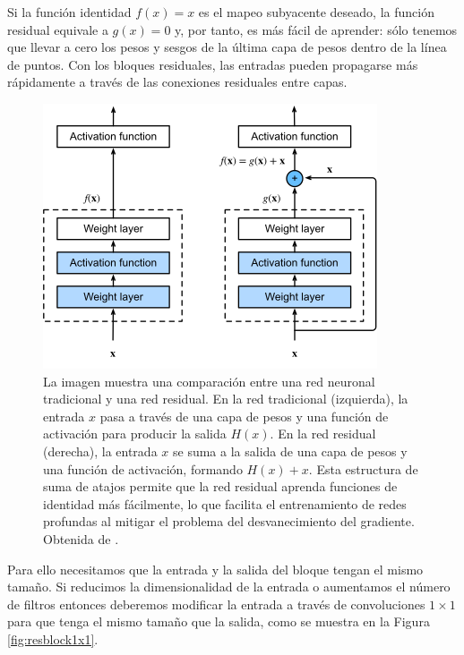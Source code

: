 Si la función identidad $f(x)=x$ es el mapeo subyacente deseado, la función residual equivale a $g(x)=0$ y, por tanto, es más fácil de aprender: sólo tenemos que llevar a cero los pesos y sesgos de la última capa de pesos dentro de la línea de puntos. Con los bloques residuales, las entradas pueden propagarse más rápidamente a través de las conexiones residuales entre capas.

\begin{figure}
    \centering
    \includegraphics[width=0.75\linewidth]{Plantilla_TFG_latex//imagenes//Inf//2.Fund/resblock.png}
    \caption[Comparación entre una red neuronal tradicional y una red residual]{La imagen muestra una comparación entre una red neuronal tradicional y una red residual. En la red tradicional (izquierda), la entrada $x$ pasa a través de una capa de pesos y una función de activación para producir la salida $H(x)$. En la red residual (derecha), la entrada $x$ se suma a la salida de una capa de pesos y una función de activación, formando $H(x) + x$. Esta estructura de suma de atajos permite que la red residual aprenda funciones de identidad más fácilmente, lo que facilita el entrenamiento de redes profundas al mitigar el problema del desvanecimiento del gradiente. Obtenida de \cite{divedeeplearning}.}
    \label{fig:resblock}
\end{figure}

Para ello necesitamos que la entrada y la salida del bloque tengan el mismo tamaño. Si reducimos la dimensionalidad de la entrada o aumentamos el número de filtros entonces deberemos modificar la entrada a través de convoluciones $1 \times 1$ para que tenga el mismo tamaño que la salida, como se muestra en la Figura \ref{fig:resblock1x1}.

